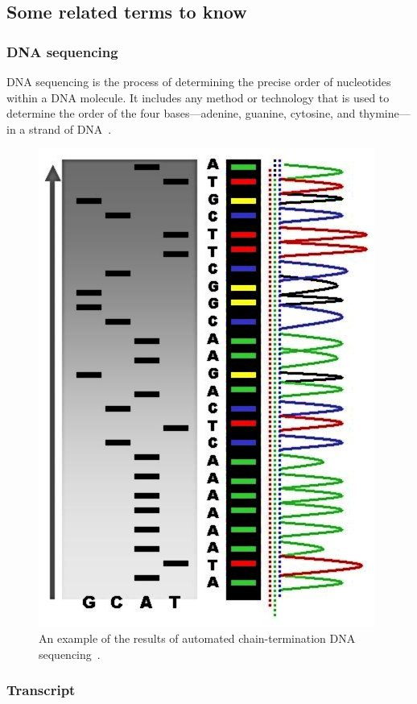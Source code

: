 \subsection{Some related terms to know}

\subsubsection{DNA sequencing}
DNA sequencing is the process of determining the precise order of nucleotides within a DNA molecule. It includes any method or technology that is used to determine the order of the four bases—adenine, guanine, cytosine, and thymine—in a strand of DNA~\cite{wiki:dnaseq}. 

\begin{figure}[htp]
\centering
\includegraphics[scale=0.50]{Radioactive_Fluorescent_Seq.jpg}
\caption{An example of the results of automated chain-termination DNA sequencing~\cite{wiki:dnaseq}.}
\label{seq}
\end{figure}
\subsubsection{Transcript}

